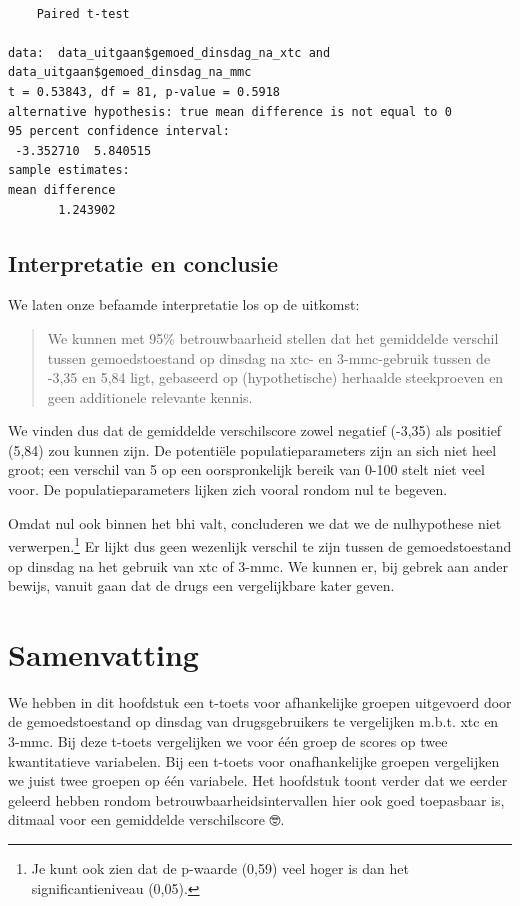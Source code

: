 \documentclass[
  letterpaper,
  DIV=11,
  numbers=noendperiod]{scrreprt}
\begin{document}
\begin{verbatim}

    Paired t-test

data:  data_uitgaan$gemoed_dinsdag_na_xtc and data_uitgaan$gemoed_dinsdag_na_mmc
t = 0.53843, df = 81, p-value = 0.5918
alternative hypothesis: true mean difference is not equal to 0
95 percent confidence interval:
 -3.352710  5.840515
sample estimates:
mean difference 
       1.243902 
\end{verbatim}

\subsection{Interpretatie en
conclusie}\label{interpretatie-en-conclusie}

We laten onze befaamde interpretatie los op de uitkomst:

\begin{quote}
We kunnen met 95\% betrouwbaarheid stellen dat het gemiddelde verschil
tussen gemoedstoestand op dinsdag na xtc- en 3-mmc-gebruik tussen de
-3,35 en 5,84 ligt, gebaseerd op (hypothetische) herhaalde steekproeven
en geen additionele relevante kennis.
\end{quote}

We vinden dus dat de gemiddelde verschilscore zowel negatief (-3,35) als
positief (5,84) zou kunnen zijn. De potentiële populatieparameters zijn
an sich niet heel groot; een verschil van 5 op een oorspronkelijk bereik
van 0-100 stelt niet veel voor. De populatieparameters lijken zich
vooral rondom nul te begeven.

Omdat nul ook binnen het bhi valt, concluderen we dat we de nulhypothese
niet verwerpen.\footnote{Je kunt ook zien dat de p-waarde (0,59) veel
  hoger is dan het significantieniveau (0,05).} Er lijkt dus geen
wezenlijk verschil te zijn tussen de gemoedstoestand op dinsdag na het
gebruik van xtc of 3-mmc. We kunnen er, bij gebrek aan ander bewijs,
vanuit gaan dat de drugs een vergelijkbare kater geven.

\section{Samenvatting}\label{samenvatting-5}

We hebben in dit hoofdstuk een t-toets voor afhankelijke groepen
uitgevoerd door de gemoedstoestand op dinsdag van drugsgebruikers te
vergelijken m.b.t. xtc en 3-mmc. Bij deze t-toets vergelijken we voor
één groep de scores op twee kwantitatieve variabelen. Bij een t-toets
voor onafhankelijke groepen vergelijken we juist twee groepen op één
variabele. Het hoofdstuk toont verder dat we eerder geleerd hebben
rondom betrouwbaarheidsintervallen hier ook goed toepasbaar is, ditmaal
voor een gemiddelde verschilscore 🤓.
\end{document}
